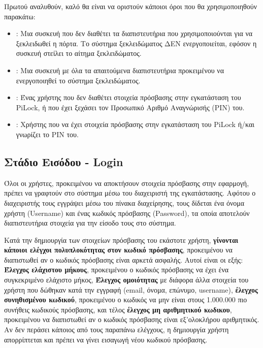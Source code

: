 	Πρωτού αναλυθούν, καλό θα είναι να οριστούν κάποιοι όροι που θα χρησιμοποιηθούν παρακάτω:
	\begin{itemize}
		\item \textbf{}: Μια συσκευή που δεν διαθέτει τα διαπιστευτήρια που χρησιμοποιούνται για να ξεκλειδωθεί η πόρτα. Το σύστημα ξεκλειδώματος ΔΕΝ ενεργοποιείται, εφόσον η συσκευή στείλει το αίτημα ξεκλειδώματος.
		\item \textbf{}: Μια συσκευή με όλα τα απαιτούμενα διαπιστευτήρια προκειμένου να ενεργοποιηθεί το σύστημα ξεκλειδώματος.
		\item \textbf{}: Ένας χρήστης που δεν διαθέτει στοιχεία πρόσβασης στην εγκατάσταση του PiLock, ή που έχει ξεχάσει τον Προσωπικό Αριθμό Αναγνώρισής (PIN) του.
		\item \textbf{}: Χρήστης που να έχει στοιχεία πρόσβασης στην εγκατάσταση του PiLock ή/και γνωρίζει το PIN του.
	\end{itemize}

	\subsection{Στάδιο Εισόδου - Login}
		\label{subsec:login_stage}
		Όλοι οι χρήστες, προκειμένου να αποκτήσουν στοιχεία πρόσβασης στην εφαρμογή, πρέπει να γραφτούν στο σύστημα μέσω του διαχειριστή της εγκατάστασης. Αφότου ο διαχειριστής τους εγγράψει μέσω του πίνακα διαχείρησης, τους δίδεται ένα όνομα χρήστη (Username) και ένας κωδικός πρόσβασης (Password), τα οποία αποτελούν διαπιστευτήρια στοιχεία για την είσοδο τους στο σύστημα.

		Κατά την δημιουργία των στοιχείων πρόσβασης του εκάστοτε χρήστη, \textbf{γίνονται κάποιοι ελέγχοι πολυπλοκότητας στον κωδικό πρόσβασης}, προκειμένου να διαπιστωθεί αν ο κωδικός πρόσβασης είναι αρκετά ασφαλής. Αυτοί είναι οι εξής: \textbf{Έλεγχος ελάχιστου μήκους}, προκειμένου ο κωδικός πρόσβασης να έχει ένα συγκεκριμένο ελάχιστο μήκος, \textbf{Έλεγχος ομοιότητας} με διάφορα άλλα στοιχεία του χρήστη που δώθηκαν κατά την εγγραφή (email, όνομα, επώνυμο, username), \textbf{έλεγχος συνηθισμένου κωδικού}, προκειμένου ο κωδικός να μην είναι στους 1.000.000 πιο συνήθεις κωδικούς πρόσβασης, και τέλος \textbf{έλεγχος μη αριθμητικού κωδικου}, προκειμένου να διαπιστωθεί αν ο κωδικός πρόσβασης είναι εξ'ολοκλήρου αριθμητικός. Αν δεν περάσει κάποιος από τους παραπάνω ελέγχους, η δημιουργία χρήστη απορρίπτεται και πρέπει να γίνει εισαγωγή νέου κωδικού πρόσβασης.

